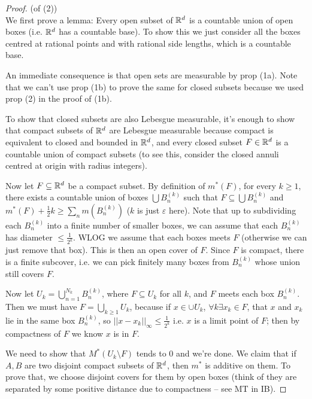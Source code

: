 \documentclass[a4paper]{article}
\begin{document}
\begin{proof} (of (2))\\
We first prove a lemma: Every open subset of $\mathbb{R}^d$ is a countable union of open boxes (i.e. $\mathbb{R}^d$ has a countable base). To show this we just consider all the boxes centred at rational points and with rational side lengths, which is a countable base.

An immediate consequence is that open sets are measurable by prop (1a). Note that we can't use prop (1b) to prove the same for closed subsets because we used prop (2) in the proof of (1b).

To show that closed subsets are also Lebesgue measurable, it's enough to show that compact subsets of $\mathbb{R}^d$ are Lebesgue measurable because compact is equivalent to closed and bounded in $\mathbb{R}^d$, and every closed subset $F \in \mathbb{R}^d$ is a countable union of compact subsets (to see this, consider the closed annuli centred at origin with radius integers). 

Now let $F \subseteq \mathbb{R}^d$ be a compact subset. By definition of $m^*(F)$, for every $k \geq 1$, there exists a countable union of boxes $\bigcup B^{(k)}_n$ such that $F \subseteq \bigcup B^{(k)}_n$ and $m^*(F) + \frac{1}{2} k \geq \sum_n m(B^{(k)}_n)$ ($k$ is just $\varepsilon$ here). Note that up to subdividing each $B^{(k)}_n$ into a finite number of smaller boxes, we can assume that each $B^{(k)}_n$ has diameter $\leq \frac{1}{2^k}$. WLOG we assume that each boxes meets $F$ (otherwise we can just remove that box). This is then an open cover of $F$. Since $F$ is compact, there is a finite subcover, i.e. we can pick finitely many boxes from $B^{(k)}_n$ whose union still covers $F$.

Now let $U_k = \bigcup_{n=1}^{N_k} B^{(k)}_n$, where $F \subseteq U_k$ for all $k$, and $F$ meets each box $B^{(k)}_n$. Then we must have $F = \bigcup_{k \geq 1} U_k$, because if $x \in \cup U_k$, $\forall k \exists x_k \in F$, that $x$ and $x_k$ lie in the same box $B^{(k)}_n$, so $||x-x_k||_\infty \leq \frac{1}{2^k}$ i.e. $x$ is a limit point of $F$; then by compactness of $F$ we know $x$ is in $F$.

We need to show that $M^*(U_k \setminus F)$ tends to $0$ and we're done. We claim that if $A,B$ are two disjoint compact subsets of $\mathbb{R}^d$, then $m^*$ is additive on them. To prove that, we choose disjoint covers for them by open boxes (think of they are separated by some positive distance due to compactness -- see MT in IB).


\end{proof}
\end{document}
